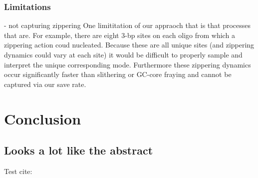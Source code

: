 \documentclass[journal=jpcbfk,manuscript=article]{achemso}
\begin{document}
\subsubsection{\label{sec:Results}Limitations} 
- not capturing zippering
One limititation of our appraoch that is that processes that are. For example, there are eight 3-bp sites on each oligo from which a zippering action coud nucleated. Because these are all unique sites (and zippering dynamics could vary at each site) it would be difficult to properly sample and interpret the unique corresponding mode. Furthermore these zippering dynamics occur significantly faster than slithering or GC-core fraying and cannot be captured via our save rate.


    
\section{\label{sec:conc}Conclusion}
\subsection{\label{sec:Results}Looks a lot like the abstract}



\clearpage
\newpage

%
Test cite: \citep{Zhang2018DeepMechanics}



\clearpage
\end{document}
